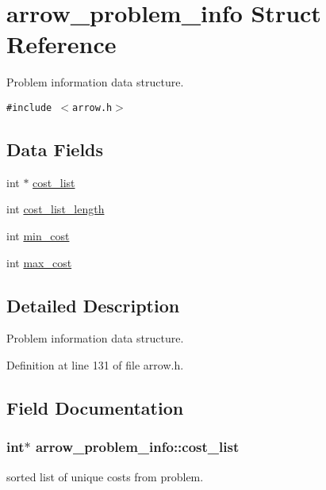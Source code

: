 \hypertarget{structarrow__problem__info}{
\section{arrow\_\-problem\_\-info Struct Reference}
\label{structarrow__problem__info}
}
Problem information data structure.  


{\tt \#include $<$arrow.h$>$}

\subsection*{Data Fields}
\begin{CompactItemize}
\item 
int $\ast$ \hyperlink{structarrow__problem__info_7c9472312d7057fb9d74eb5579930216}{cost\_\-list}
\item 
int \hyperlink{structarrow__problem__info_54bbdc187af19361072480b45016f171}{cost\_\-list\_\-length}
\item 
int \hyperlink{structarrow__problem__info_46fabcc0ccd3a732cebb014331d4eeb5}{min\_\-cost}
\item 
int \hyperlink{structarrow__problem__info_724060f3be25521cca761899913c2776}{max\_\-cost}
\end{CompactItemize}


\subsection{Detailed Description}
Problem information data structure. 

Definition at line 131 of file arrow.h.

\subsection{Field Documentation}
\hypertarget{structarrow__problem__info_7c9472312d7057fb9d74eb5579930216}{
\subsubsection{\setlength{\rightskip}{0pt plus 5cm}int$\ast$ {\bf arrow\_\-problem\_\-info::cost\_\-list}}}
\label{structarrow__problem__info_7c9472312d7057fb9d74eb5579930216}


sorted list of unique costs from problem. 

